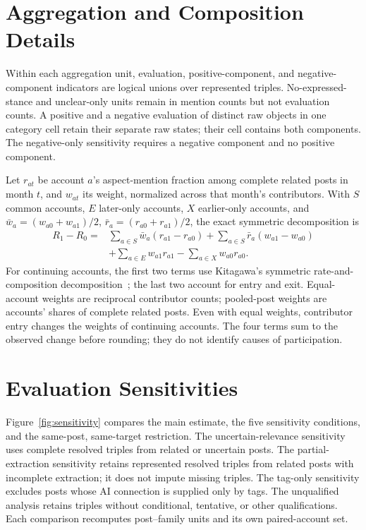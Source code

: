 \documentclass[sigconf,balance=false]{acmart}
\begin{document}
\section{Aggregation and Composition Details}\label{app:decomposition}
Within each aggregation unit, evaluation, positive-component, and negative-component indicators are logical unions over represented triples. No-expressed-stance and unclear-only units remain in mention counts but not evaluation counts. A positive and a negative evaluation of distinct raw objects in one category cell retain their separate raw states; their cell contains both components. The negative-only sensitivity requires a negative component and no positive component.

Let $r_{at}$ be account $a$'s aspect-mention fraction among complete related posts in month $t$, and $w_{at}$ its weight, normalized across that month's contributors. With $S$ common accounts, $E$ later-only accounts, $X$ earlier-only accounts, and $\bar w_a=(w_{a0}+w_{a1})/2$, $\bar r_a=(r_{a0}+r_{a1})/2$, the exact symmetric decomposition is
\begin{equation}
\begin{split}
R_1-R_0={}&\sum_{a\in S}\bar w_a(r_{a1}-r_{a0})
+\sum_{a\in S}\bar r_a(w_{a1}-w_{a0})\\
&+\sum_{a\in E}w_{a1}r_{a1}
-\sum_{a\in X}w_{a0}r_{a0}.
\end{split}
\end{equation}
For continuing accounts, the first two terms use Kitagawa's symmetric rate-and-composition decomposition~\cite{kitagawa1955}; the last two account for entry and exit. Equal-account weights are reciprocal contributor counts; pooled-post weights are accounts' shares of complete related posts. Even with equal weights, contributor entry changes the weights of continuing accounts. The four terms sum to the observed change before rounding; they do not identify causes of participation.

\section{Evaluation Sensitivities}\label{app:sensitivity}
Figure~\ref{fig:sensitivity} compares the main estimate, the five sensitivity conditions, and the same-post, same-target restriction. The uncertain-relevance sensitivity uses complete resolved triples from related or uncertain posts. The partial-extraction sensitivity retains represented resolved triples from related posts with incomplete extraction; it does not impute missing triples. The tag-only sensitivity excludes posts whose AI connection is supplied only by tags. The unqualified analysis retains triples without conditional, tentative, or other qualifications. Each comparison recomputes post--family units and its own paired-account set.
\end{document}
